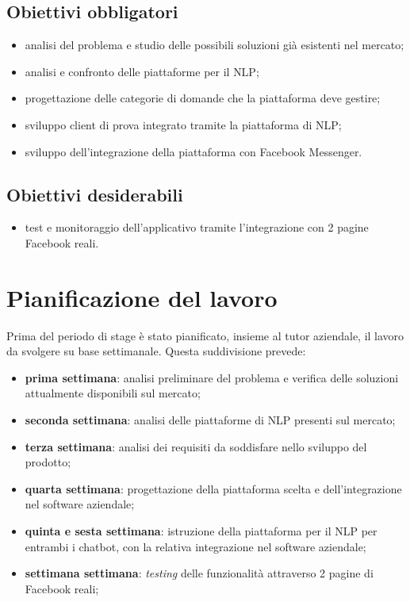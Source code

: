\subsection{Obiettivi obbligatori}
\begin{itemize}
	\item analisi del problema e studio delle possibili soluzioni già esistenti nel mercato;
	\item analisi e confronto delle piattaforme per il \gls{NLP};
	\item progettazione delle categorie di domande che la piattaforma deve gestire;
	\item sviluppo client di prova integrato tramite la piattaforma di \gls{NLP};
	\item sviluppo dell'integrazione della piattaforma con Facebook Messenger.
\end{itemize}

\subsection{Obiettivi desiderabili}
\begin{itemize}
	\item test e monitoraggio dell’applicativo tramite l’integrazione con 2 pagine Facebook reali.
\end{itemize}

\section{Pianificazione del lavoro}
Prima del periodo di stage è stato pianificato, insieme al tutor aziendale, il lavoro da svolgere su base settimanale. Questa suddivisione prevede:
\begin{itemize}
	\item \textbf{prima settimana}: analisi preliminare del problema e verifica delle soluzioni attualmente disponibili sul mercato;
	\item \textbf{seconda settimana}: analisi delle piattaforme di \gls{NLP} presenti sul mercato;
	\item \textbf{terza settimana}: analisi dei requisiti da soddisfare nello sviluppo del prodotto;
	\item \textbf{quarta settimana}: progettazione della piattaforma scelta e dell'integrazione nel software aziendale;
	\item \textbf{quinta e sesta settimana}: istruzione della piattaforma per il \gls{NLP} per entrambi i \gls{chatbot}, con la relativa integrazione nel software aziendale;
	\item \textbf{settimana settimana}: \emph{testing} delle funzionalità attraverso 2 pagine di Facebook reali;
\end{itemize}

